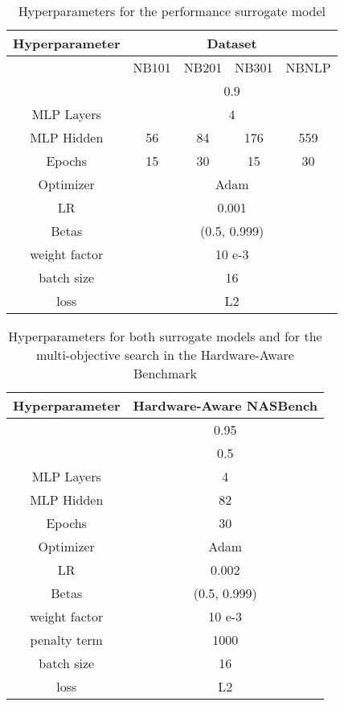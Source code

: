 \documentclass[runningheads]{llncs}
\begin{document}
\begin{table}[h]
	\scriptsize
	\centering
	\caption{Hyperparameters for the performance surrogate model }\label{table:HP_simple_surrogate}
	\begin{tabular}{c ||ccc c}
		\toprule
		Hyperparameter      & \multicolumn{4}{c}{Dataset}  \\
		\midrule
		& NB101    & NB201   & NB301 & NBNLP   \\
		\midrule
		              &    \multicolumn{4}{c}{0.9} \\       
		MLP Layers          &    \multicolumn{4}{c}{4}     \\
		MLP Hidden          &      56 & 84  & 176 & 559   \\
		Epochs              &    15      &  30 &  15 &  30  \\
		Optimizer           &   \multicolumn{4}{c}{Adam \cite{2015ADAM}}   \\
		LR                  & \multicolumn{4}{c}{0.001} \\     
		Betas               & \multicolumn{4}{c}{(0.5, 0.999)} \\
		weight factor       &    \multicolumn{4}{c}{10 e-3}   \\
		batch size          &   \multicolumn{4}{c}{16}  \\
		loss          &      \multicolumn{4}{c}{L2} \\
		\bottomrule
		
	\end{tabular}
\end{table}


\begin{table}[h]
	\scriptsize
	\centering
	\caption{Hyperparameters for both surrogate models  and  for the multi-objective search in the Hardware-Aware Benchmark}\label{table:HP_multi_surrogate}
	\begin{tabular}{c || c}
		\toprule
		
		Hyperparameter      & Hardware-Aware NASBench \\
		\midrule
		               &   0.95  \\  
		            & 0.5 \\
		MLP Layers          &       4      \\
		MLP Hidden          &      82    \\
		Epochs              &      30  \\
		Optimizer           &    Adam  \cite{2015ADAM}   \\
		LR                  &   0.002 \\     
		Betas               &  (0.5, 0.999) \\
		weight factor       &     10 e-3 \\
		penalty term         & 1000 \\
		batch size          &     16 \\
		loss                & L2\\
		\bottomrule
		
	\end{tabular}
\end{table}
\end{document}
